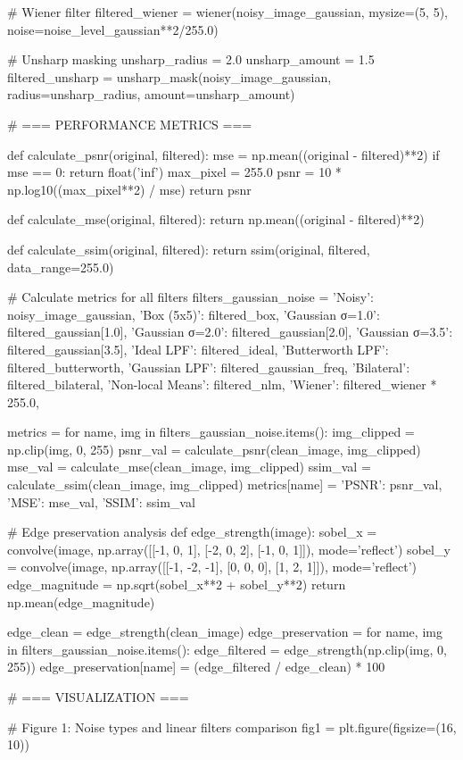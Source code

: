 \documentclass[a4paper, 11pt]{article}
\begin{document}
\begin{pycode}
# Wiener filter
filtered_wiener = wiener(noisy_image_gaussian, mysize=(5, 5), noise=noise_level_gaussian**2/255.0)

# Unsharp masking
unsharp_radius = 2.0
unsharp_amount = 1.5
filtered_unsharp = unsharp_mask(noisy_image_gaussian, radius=unsharp_radius, amount=unsharp_amount)

# === PERFORMANCE METRICS ===

def calculate_psnr(original, filtered):
    mse = np.mean((original - filtered)**2)
    if mse == 0:
        return float('inf')
    max_pixel = 255.0
    psnr = 10 * np.log10((max_pixel**2) / mse)
    return psnr

def calculate_mse(original, filtered):
    return np.mean((original - filtered)**2)

def calculate_ssim(original, filtered):
    return ssim(original, filtered, data_range=255.0)

# Calculate metrics for all filters
filters_gaussian_noise = {
    'Noisy': noisy_image_gaussian,
    'Box (5x5)': filtered_box,
    'Gaussian σ=1.0': filtered_gaussian[1.0],
    'Gaussian σ=2.0': filtered_gaussian[2.0],
    'Gaussian σ=3.5': filtered_gaussian[3.5],
    'Ideal LPF': filtered_ideal,
    'Butterworth LPF': filtered_butterworth,
    'Gaussian LPF': filtered_gaussian_freq,
    'Bilateral': filtered_bilateral,
    'Non-local Means': filtered_nlm,
    'Wiener': filtered_wiener * 255.0,
}

metrics = {}
for name, img in filters_gaussian_noise.items():
    img_clipped = np.clip(img, 0, 255)
    psnr_val = calculate_psnr(clean_image, img_clipped)
    mse_val = calculate_mse(clean_image, img_clipped)
    ssim_val = calculate_ssim(clean_image, img_clipped)
    metrics[name] = {'PSNR': psnr_val, 'MSE': mse_val, 'SSIM': ssim_val}

# Edge preservation analysis
def edge_strength(image):
    sobel_x = convolve(image, np.array([[-1, 0, 1], [-2, 0, 2], [-1, 0, 1]]), mode='reflect')
    sobel_y = convolve(image, np.array([[-1, -2, -1], [0, 0, 0], [1, 2, 1]]), mode='reflect')
    edge_magnitude = np.sqrt(sobel_x**2 + sobel_y**2)
    return np.mean(edge_magnitude)

edge_clean = edge_strength(clean_image)
edge_preservation = {}
for name, img in filters_gaussian_noise.items():
    edge_filtered = edge_strength(np.clip(img, 0, 255))
    edge_preservation[name] = (edge_filtered / edge_clean) * 100

# === VISUALIZATION ===

# Figure 1: Noise types and linear filters comparison
fig1 = plt.figure(figsize=(16, 10))


\end{pycode}
\end{document}
